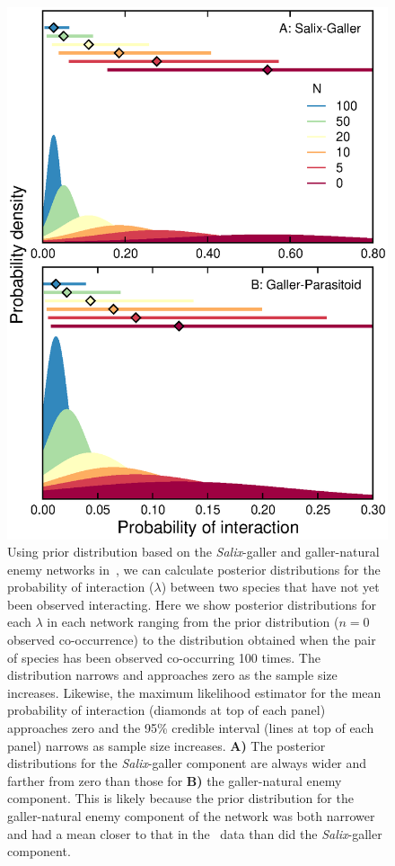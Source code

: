 \documentclass[12pt]{article}
\begin{document}
      \begin{figure}[h!]
        \caption{Using prior distribution based on the \emph{Salix}-galler and galler-natural enemy networks in~\citet{Barbour2016}, we can calculate posterior distributions for the probability of interaction ($\lambda$) between two species that have not yet been observed interacting. Here we show posterior distributions for each $\lambda$ in each network ranging from the prior distribution ($n=0$ observed co-occurrence) to the distribution obtained when the pair of species has been observed co-occurring 100 times. The distribution narrows and approaches zero as the sample size increases. Likewise, the maximum likelihood estimator for the mean probability of interaction (diamonds at top of each panel) approaches zero and the 95\% credible interval (lines at top of each panel) narrows as sample size increases. \textbf{A)} The posterior distributions for the \emph{Salix}-galler component are always wider and farther from zero than those for \textbf{B)} the galler-natural enemy component. This is likely because the prior distribution for the galler-natural enemy component of the network was both narrower and had a mean closer to that in the~\citet{Kopelke2017} data than did the \emph{Salix}-galler component.}
        \label{Salix_pdfs}
        \begin{center}
        \includegraphics*[width=.65\textwidth]{figures/Salix_Galler_pdfs_increasing_N.eps}
        \end{center}
        \end{figure}
\end{document}
